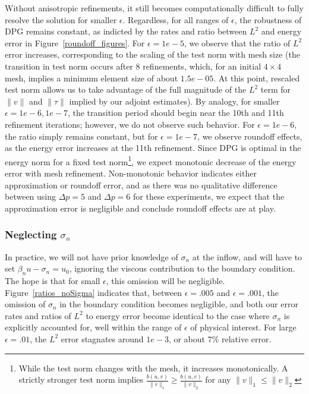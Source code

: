 \documentclass[11pt,onecolumn]{scrartcl}
\begin{document}
Without anisotropic refinements, it still becomes computationally difficult to fully resolve the solution for smaller $\epsilon$. Regardless, for all ranges of $\epsilon$, the robustness of DPG remains constant, as indicted by the rates and ratio between $L^2$ and energy error in Figure~\ref{roundoff_figures}. For $\epsilon = 1e-5$, we observe that the ratio of $L^2$ error increases, corresponding to the scaling of the test norm with mesh size (the transition in test norm occurs after 8 refinements, which, for an initial $4\times 4$ mesh, implies a minimum element size of about $1.5e-05$. At this point, rescaled test norm allows us to take advantage of the full magnitude of the $L^2$ term for $\|v\|$ and $\|\tau\|$ implied by our adjoint estimates). By analogy, for smaller $\epsilon = 1e-6, 1e-7$, the transition period should begin near the 10th and 11th refinement iterations; however, we do not observe such behavior. For $\epsilon=1e-6$, the ratio simply remains constant, but for $\epsilon=1e-7$, we observe roundoff effects, as the energy error increases at the 11th refinement. Since DPG is optimal in the energy norm for a fixed test norm\footnote{While the test norm changes with the mesh, it increases monotonically. A strictly stronger test norm implies $\frac{b(u,v)}{\|v\|_1} \geq \frac{b(u,v)}{\|v\|_2}$ for any $\|v\|_1 \leq \|v\|_2$}, we expect monotonic decrease of the energy error with mesh refinement. Non-monotonic behavior indicates either approximation or roundoff error, and as there was no qualitative difference between using $\Delta p = 5$ and $\Delta p = 6$ for these experiments, we expect that the approximation error is negligible and conclude roundoff effects are at play. 

\subsubsection{Neglecting $\sigma_n$}

In practice, we will not have prior knowledge of $\sigma_n$ at the inflow, and will have to set $\beta_n u - \sigma_n = u_0$, ignoring the viscous contribution to the boundary condition.  The hope is that for small $\epsilon$, this omission will be negligible. Figure~\ref{ratios_noSigma} indicates that, between $\epsilon = .005$ and $\epsilon = .001$, the omission of $\sigma_n$ in the boundary condition becomes negligible, and both our error rates and ratios of $L^2$ to energy error become identical to the case where $\sigma_n$ is explicitly accounted for, well within the range of $\epsilon$ of physical interest. For large $\epsilon = .01$, the $L^2$ error stagnates around $1e-3$, or about $7\%$ relative error. 
\end{document}
